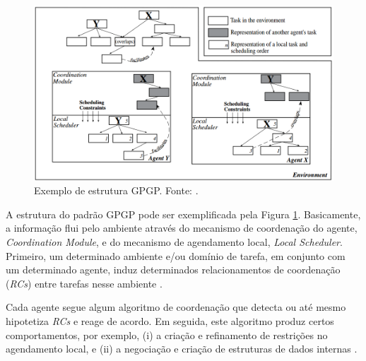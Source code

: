 \begin{description}
\begin{figure}[h!]
    \centering
    \includegraphics[scale=0.42]{figuras/pgp/pgp_generalized.png}
    \caption{Exemplo de estrutura GPGP. Fonte: .}
    \label{fig:pgp_generalized}
\end{figure}

A estrutura do padrão GPGP pode ser exemplificada pela Figura \ref{fig:pgp_generalized}. Basicamente, a informação flui pelo ambiente através do mecanismo de coordenação do agente, \textit{Coordination Module}, e do mecanismo de agendamento local, \textit{Local Scheduler}. Primeiro, um determinado ambiente e/ou domínio de tarefa, em conjunto com um determinado agente, induz determinados relacionamentos de coordenação (\textit{RCs}) entre tarefas nesse ambiente \cite{decker1992generalizing}. 

Cada agente segue algum algoritmo de coordenação que detecta ou até mesmo hipotetiza \textit{RCs} e reage de acordo. Em seguida, este algoritmo produz certos comportamentos, por exemplo, (i) a criação e refinamento de restrições no agendamento local, e (ii) a negociação e criação de estruturas de dados internas \cite{decker1992generalizing}.






\end{description}
